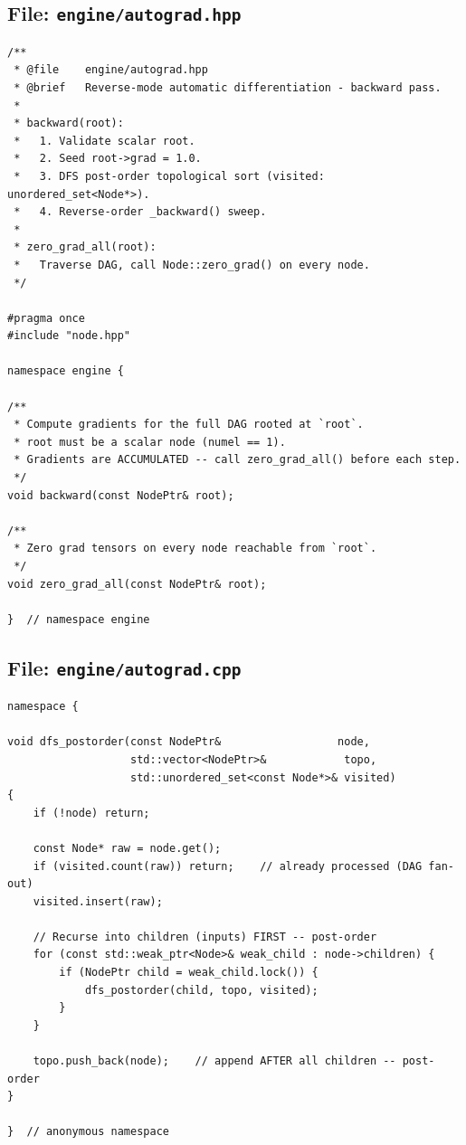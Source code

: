 \documentclass[12pt, a4paper]{article}
\begin{document}
\subsection{File: \texttt{engine/autograd.hpp}}

\begin{lstlisting}[caption={\texttt{engine/autograd.hpp} - complete header}]
/**
 * @file    engine/autograd.hpp
 * @brief   Reverse-mode automatic differentiation - backward pass.
 *
 * backward(root):
 *   1. Validate scalar root.
 *   2. Seed root->grad = 1.0.
 *   3. DFS post-order topological sort (visited: unordered_set<Node*>).
 *   4. Reverse-order _backward() sweep.
 *
 * zero_grad_all(root):
 *   Traverse DAG, call Node::zero_grad() on every node.
 */

#pragma once
#include "node.hpp"

namespace engine {

/**
 * Compute gradients for the full DAG rooted at `root`.
 * root must be a scalar node (numel == 1).
 * Gradients are ACCUMULATED -- call zero_grad_all() before each step.
 */
void backward(const NodePtr& root);

/**
 * Zero grad tensors on every node reachable from `root`.
 */
void zero_grad_all(const NodePtr& root);

}  // namespace engine
\end{lstlisting}

\newpage
\subsection{File: \texttt{engine/autograd.cpp}}

\begin{lstlisting}[caption={\texttt{dfs\_postorder} - the recursive sort helper}]
namespace {

void dfs_postorder(const NodePtr&                  node,
                   std::vector<NodePtr>&            topo,
                   std::unordered_set<const Node*>& visited)
{
    if (!node) return;

    const Node* raw = node.get();
    if (visited.count(raw)) return;    // already processed (DAG fan-out)
    visited.insert(raw);

    // Recurse into children (inputs) FIRST -- post-order
    for (const std::weak_ptr<Node>& weak_child : node->children) {
        if (NodePtr child = weak_child.lock()) {
            dfs_postorder(child, topo, visited);
        }
    }

    topo.push_back(node);    // append AFTER all children -- post-order
}

}  // anonymous namespace
\end{lstlisting}
\end{document}
